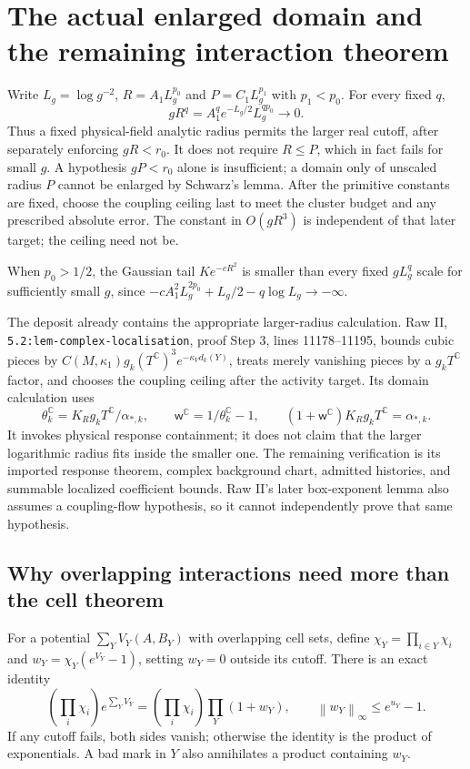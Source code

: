 \documentclass[11pt]{article}
\theoremstyle{remark}
\newcommand{\C}{\mathbb C}
\newcommand{\norm}[1]{\left\|#1\right\|}
\begin{document}
\section{The actual enlarged domain and the remaining interaction theorem}

Write $L_g=\log g^{-2}$, $R=A_1L_g^{p_0}$ and
$P=C_1L_g^{p_1}$ with $p_1<p_0$. For every fixed $q$,
\[
 gR^q=A_1^qe^{-L_g/2}L_g^{qp_0}\longrightarrow0.
\]
Thus a fixed physical-field analytic radius permits the larger real
cutoff, after separately enforcing $gR<r_0$. It does not require
$R\le P$, which in fact fails for small $g$. A hypothesis $gP<r_0$
alone is insufficient; a domain only of unscaled radius $P$ cannot
be enlarged by Schwarz's lemma. After the primitive constants are
fixed, choose the coupling ceiling last to meet the cluster budget
and any prescribed absolute error. The constant in $O(gR^3)$ is
independent of that later target; the ceiling need not be.

When $p_0>1/2$, the Gaussian tail $Ke^{-cR^2}$ is smaller than every
fixed $gL_g^q$ scale for sufficiently small $g$, since
$-cA_1^2L_g^{2p_0}+L_g/2-q\log L_g\to-\infty$.

The deposit already contains the appropriate larger-radius calculation.
Raw II, \texttt{5.2:lem-complex-localisation}, proof Step 3,
lines 11178--11195, bounds cubic pieces by
$C(M,\kappa_1)g_k(T^{\C})^3e^{-\kappa_Vd_k(Y)}$, treats merely
vanishing pieces by a $g_kT^{\C}$ factor, and chooses the coupling
ceiling after the activity target. Its domain calculation uses
\[
 \theta_k^{\C}=K_Rg_kT^{\C}/\alpha_{*,k},\qquad
 \mathsf w^{\C}=1/\theta_k^{\C}-1,
 \qquad(1+\mathsf w^{\C})K_Rg_kT^{\C}=\alpha_{*,k}.
\]
It invokes physical response containment; it does not claim that
the larger logarithmic radius fits inside the smaller one. The
remaining verification is its imported response theorem, complex
background chart, admitted histories, and summable localized
coefficient bounds. Raw II's later box-exponent lemma also assumes
a coupling-flow hypothesis, so it cannot independently prove that
same hypothesis.

\subsection{Why overlapping interactions need more than the cell theorem}

For a potential $\sum_YV_Y(A,B_Y)$ with overlapping cell sets, define
$\chi_Y=\prod_{i\in Y}\chi_i$ and
$w_Y=\chi_Y(e^{V_Y}-1)$, setting $w_Y=0$ outside its cutoff.
There is an exact identity
\[
 \left(\prod_i\chi_i\right)e^{\sum_YV_Y}
 =\left(\prod_i\chi_i\right)\prod_Y(1+w_Y),
 \qquad \norm{w_Y}_\infty\le e^{u_Y}-1.
\]
If any cutoff fails, both sides vanish; otherwise the identity is
the product of exponentials. A bad mark in $Y$ also annihilates a
product containing $w_Y$.
\end{document}

